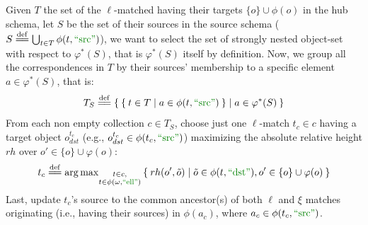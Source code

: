 \begin{example}[continues=ex:examplegraphdata,label=ex:examplereferencedOcaml]
\begin{itemize}
	Given $T$ the set of the $\ell$-matched having their targets $\{o\}\cup\phi(o)$ in the hub schema, let $S$ be the set of their sources in the source schema ($S\eqdef \bigcup_{t\in T}\phi(t,\mstr{src})$), we want to select the set of strongly nested object-set with respect to $\varphi^*(S)$, that is $\varphi^*(S)$ itself by definition. Now, we group all the correspondences in $T$ by their sources' membership to a specific element $a\in\varphi^*(S)$, that is:
	\[T_S\eqdef \Set{\Set{t\in T|a\in\phi(t,\mstr{src})}|a\in\varphi^*(S)}\]
	From each non empty collection $c\in T_S$, choose just one $\ell$-match $t_c\in c$ having a target object $o_{dst}^{t_c}$ (e.g., $o_{dst}^{t_c}\in\phi(t_c,\mstr{src})$) maximizing the absolute relative height $rh$ over $o'\in\{o\}\cup\varphi(o)$:
	\[t_c\eqdef \argmax_{\substack{t\in c,\\ t\in\phi(\omega,\mstr{ell})}}\Set{rh(o',\tilde{o})|\tilde{o}\in\phi(t,\mstr{dst}),o'\in\{o\}\cup\varphi(o)}\]
	Last, update $t_c$'s source to the common ancestor(s) of both $\ell$ and $\xi$ matches originating (i.e., having their sources) in $\phi(a_c)$, where  $a_c\in\phi(t_c,\mstr{src})$.

	

\end{itemize}
\end{example}
